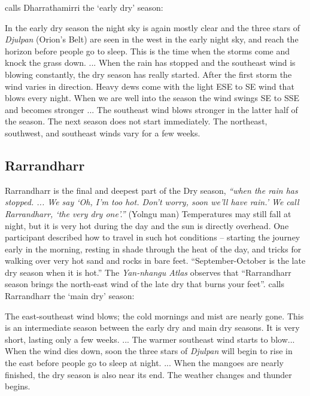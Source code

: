 \citet{davis1989} calls Dharrathamirri the `early dry' season:
\begin{bquote}{\citet{davis1989}}
    In the early dry season the night sky is again mostly clear and the three stars of
    \textit{Djulpan} (Orion's Belt) are seen in the west in the early night sky,
    and reach the horizon before people go to sleep.
    This is the time when the storms come and knock the grass down.
    ...
    When the rain has stopped and the southeast wind is blowing constantly,
    the dry season has really started.
    After the first storm the wind varies in direction.
    Heavy dews come with the light ESE to SE wind that blows every night.
    When we are well into the season the wind swings SE to SSE and becomes stronger
    ...
    The southeast wind blows stronger in the latter half of the season.
    The next season does not start immediately.
    The northeast, southwest, and southeast winds vary for a few weeks.
\end{bquote}


\subsection{Rarrandharr}
Rarrandharr is the final and deepest part of the Dry season,
\textsl{``when the rain has stopped.  ... We say `Oh, I'm too hot.  Don't worry,
soon we'll have rain.'  We call Rarrandharr, `the very dry one'.''} (Yolngu man)
Temperatures may still fall at night, but it is very hot during the day
and the sun is directly overhead.
%
One participant described how to travel in such hot conditions -- starting
the journey early in the morning, resting in shade through the heat of the
day, and tricks for walking over very hot sand and rocks in bare feet.
%
``September-October is the late dry season when it is hot.'' \citep{barber2005}
The \textit{Yan-nhangu Atlas} observes that ``Rarrandharr season brings
the north-east wind of the late dry that burns your feet''.
\citet{davis1989} calls Rarrandharr the `main dry' season:
\begin{bquote}{\citet{davis1989}}
    The east-southeast wind blows; the cold mornings and mist are nearly gone.
    This is an intermediate season between the early dry and main dry seasons.
    It is very short, lasting only a few weeks.
    ...
    The warmer southeast wind starts to blow...
    When the wind dies down, soon the three stars of \textit{Djulpan}
    will begin to rise in the east before people go to sleep at night.
    ...
    When the mangoes are nearly finished, the dry season is also near its end.
    The weather changes and thunder begins.
\end{bquote}




